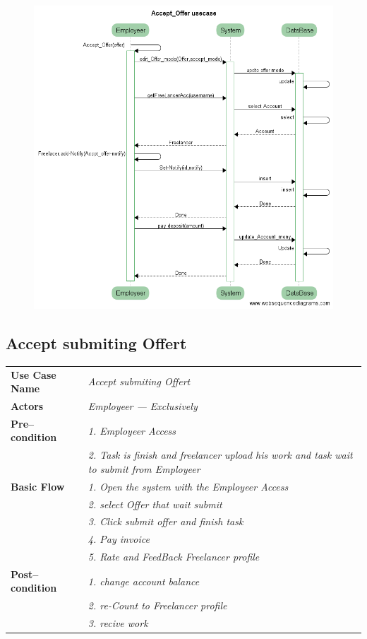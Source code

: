 \documentclass{article}
\begin{document}
\begin{figure}[ht!]
\centering
\includegraphics[width=128mm]{Accept_Offer_usecase.png}
\end{figure}


\subsection{Accept submiting Offert}
    \begin{tabular}{ l | l }
    \toprule
      \rowcolor{LightCyan}
      \textbf{Use Case Name}    & \textit{Accept submiting Offert}\\
      \textbf{Actors}           & \textit{Employeer --- Exclusively}\\
      \rowcolor{LightCyan}
      \textbf{Pre--condition}   & \textit{1. Employeer Access}\\
                                & \textit{2. Task is finish and freelancer upload his work and task wait to submit from Employeer}\\
      \textbf{Basic Flow}       & \textit{1. Open the system with the Employeer Access}\\
                                & \textit{2. select Offer that wait submit}\\
                                & \textit{3. Click submit offer and finish task}\\
                                & \textit{4. Pay invoice}\\
				& \textit{5. Rate and FeedBack Freelancer profile}\\
      \rowcolor{LightCyan}
      \textbf{Post--condition}  & \textit{1. change account balance}\\
                                & \textit{2. re-Count to Freelancer profile}\\
                                & \textit{3. recive work}\\
    \toprule
    \end{tabular}
\end{document}
